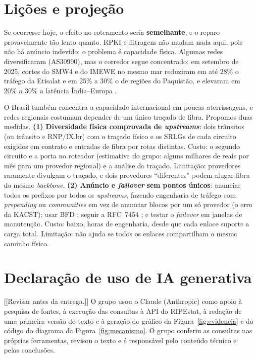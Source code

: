 \documentclass[12pt]{article}
\begin{document}
\section{Li\c{c}\~oes e proje\c{c}\~ao}

Se ocorresse hoje, o efeito no roteamento seria \textbf{semelhante}, e o reparo
provavelmente tão lento quanto. RPKI e filtragem não mudam nada aqui, pois não há anúncio
indevido: o problema é capacidade física. Algumas redes diversificaram (AS30990), mas o
corredor segue concentrado: em setembro de 2025, cortes do SMW4 e do IMEWE no mesmo mar
reduziram em até 28\% o tráfego da Etisalat e em 25\% a 30\% o de regiões do Paquistão,
e elevaram em 20\% a 30\% a latência Índia--Europa \cite{belson2025}.

O Brasil também concentra a capacidade internacional em poucas aterrissagens, e redes
regionais costumam depender de um único traçado de fibra. Propomos duas medidas. \textbf{(1) Diversidade física comprovada de
\textit{upstreams}}: dois trânsitos (ou trânsito e RNP/IX.br) com o traçado físico e os
SRLGs de cada circuito exigidos em contrato \cite{rfc4202} e entradas de fibra por rotas
distintas. Custo: o segundo circuito e a porta no roteador (estimativa do grupo: alguns
milhares de reais por mês para um provedor regional) e a análise do traçado. Limitação:
provedores raramente divulgam o traçado, e dois provedores ``diferentes'' podem alugar
fibra do mesmo \textit{backbone}. \textbf{(2) Anúncio e \textit{failover} sem pontos
únicos}: anunciar todos os prefixos por todos os \textit{upstreams}, fazendo engenharia de
tráfego com \textit{prepending} ou \textit{communities} em vez de anunciar blocos por um só
provedor (o erro da KACST); usar BFD \cite{rfc5880}; seguir a RFC~7454 \cite{rfc7454}; e testar o \textit{failover} em janelas de
manutenção. Custo: baixo, horas de engenharia, desde que cada enlace suporte a carga total.
Limitação: não ajuda se todos os enlaces compartilham o mesmo caminho físico.

\section*{Declara\c{c}\~ao de uso de IA generativa}
[[Revisar antes da entrega.]] O grupo usou o Claude (Anthropic) como apoio à pesquisa de
fontes, à execução das consultas à API do RIPEstat, à redação de uma primeira versão do
texto e à geração do gráfico da Figura~\ref{fig:evidencia} e do código do diagrama da
Figura~\ref{fig:mecanismo}. O grupo conferiu as consultas nas próprias ferramentas,
revisou o texto e é responsável pelo conteúdo técnico e pelas conclusões.


\end{document}
